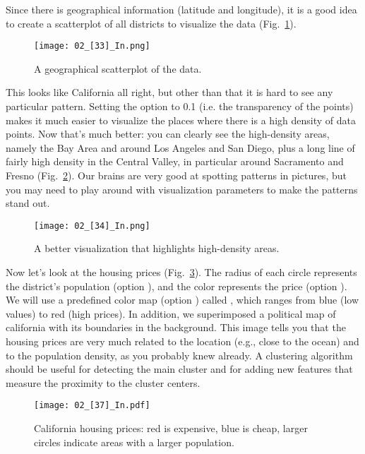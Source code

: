 Since there is geographical information (latitude and longitude), it is a good idea to create a scatterplot of all districts to visualize the data (Fig.~\ref{02_[33]_In}).
\begin{figure}[h!t]
\centering
\texttt{[image: 02\_[33]\_In.png]}
\caption{A geographical scatterplot of the data.}\label{02_[33]_In}
\end{figure}

This looks like California all right, but other than that it is hard to see any particular pattern. Setting the  option to 0.1 (i.e. the transparency of the points) makes it much easier to visualize the places where there is a high density of data points. Now that's much better: you can clearly see the high-density areas, namely the Bay Area and around Los Angeles and San Diego, plus a long line of fairly high density in the Central Valley, in particular around Sacramento and Fresno (Fig.~\ref{02_[34]_In}). Our brains are very good at spotting patterns in pictures, but you may need to play around with visualization parameters to make the patterns stand out.
\begin{figure}[h!t]
\centering
\texttt{[image: 02\_[34]\_In.png]}
\caption{A better visualization that highlights high-density areas.}\label{02_[34]_In}
\end{figure}

Now let's look at the housing prices (Fig.~\ref{02_[37]_In}). The radius of each circle represents the district's population (option ), and the color represents the price (option ). We will use a predefined color map (option ) called , which ranges from blue (low values) to red (high prices). In addition, we superimposed a political map of california with its boundaries in the background. This image tells you that the housing prices are very much related to the location (e.g., close to the ocean) and to the population density, as you probably knew already. A clustering algorithm should be useful for detecting the main cluster and for adding new features that measure the proximity to the cluster centers.
\begin{figure}[h!t]
\centering
\texttt{[image: 02\_[37]\_In.pdf]}
\caption{California housing prices: red is expensive, blue is cheap, larger circles indicate areas with a larger population.}\label{02_[37]_In}
\end{figure}
